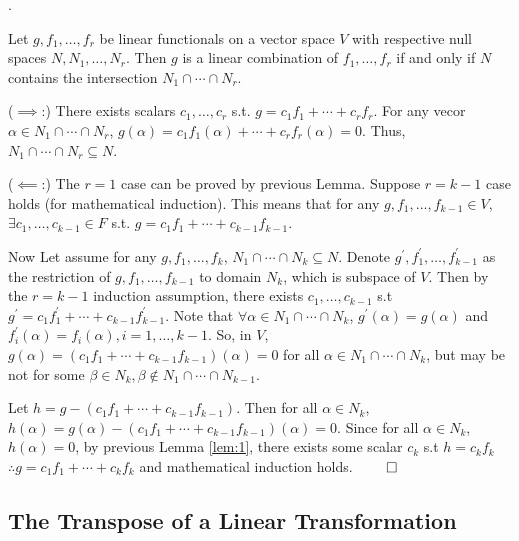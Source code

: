 \documentclass[8pt]{beamer}
\begin{document}
\begin{frame}{.}
    \begin{theorem}
        Let $g, f_1, \dots, f_r$ be linear functionals on a vector space $V$ with respective null spaces $N, N_1, \dots, N_r$.
        Then $g$ is a linear combination of $f_1, \dots, f_r$ if and only if $N$ contains the intersection $N_1 \cap \cdots \cap N_r$.
    \end{theorem}
    ($\implies$:) There exists scalars $c_1, \dots, c_r$ s.t. $g = c_1 f_1 + \cdots + c_r f_r$.
    For any vecor $\alpha \in N_1 \cap \cdots \cap N_r$, $g(\alpha) = c_1f_1(\alpha)+ \cdots + c_r f_r(\alpha) = 0$.
    Thus, $N_1 \cap \cdots \cap N_r \subseteq N$.

    ($\impliedby$:)
    The $r=1$ case can be proved by previous Lemma.
    Suppose $r=k-1$ case holds (for mathematical induction).
    This means that for any $g, f_1, \dots, f_{k-1} \in V$, $\exists c_1, \dots, c_{k-1} \in F$ s.t. $g = c_1 f_1 + \cdots + c_{k-1} f_{k-1}$.

    Now Let assume for any $g, f_1, \dots, f_k$, $N_1 \cap \cdots \cap N_k \subseteq N$.
    Denote $g^\prime, f_1^\prime, \dots, f_{k-1}^\prime$ as the restriction of $g, f_1, \dots, f_{k-1}$ to domain $N_{k}$, which is subspace of $V$.
    Then by the $r=k-1$ induction assumption, there exists $c_1, \dots, c_{k-1}$ s.t $g^\prime = c_1 f_1^\prime + \cdots +c_{k-1} f^\prime_{k-1}$.
    Note that $\forall \alpha \in N_1 \cap \cdots \cap N_k$, $g^\prime(\alpha) = g(\alpha)$ and $f_i^\prime(\alpha) = f_i (\alpha), i=1, \dots, k-1$.
    So, in $V$, $g(\alpha) = (c_1 f_1 + \cdots + c_{k-1} f_{k-1})(\alpha) = 0$ for all $\alpha \in N_1 \cap \cdots \cap N_k$,
    but may be not for some $\beta \in N_k, \beta \notin N_1 \cap \cdots \cap N_{k-1}$.

    Let $h = g - (c_1 f_1 + \cdots + c_{k-1} f_{k-1})$.
    Then for all $\alpha \in N_k$, $h(\alpha) = g(\alpha) - (c_1 f_1 + \cdots + c_{k-1} f_{k-1})(\alpha) = 0$.
    Since for all $\alpha \in N_k$, $h(\alpha) = 0$, by previous Lemma \ref{lem:1}, there exists some scalar $c_k$ s.t $h = c_k f_k$
    $\therefore g = c_1 f_1 + \cdots + c_k f_k$ and mathematical induction holds.
    $\qed$

\end{frame}

\subsection{The Transpose of a Linear Transformation}
\end{document}

